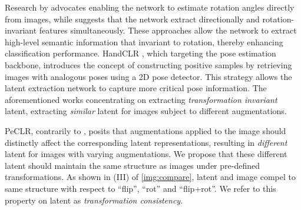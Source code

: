 Research by \cite{singh_explainable_2024} advocates enabling the network to estimate rotation angles directly from images, while \cite{feng_self-supervised_2019} suggests that the network extract directionally and rotation-invariant features simultaneously. These approaches allow the network to extract high-level semantic information that invariant to rotation, thereby enhancing classification performance. HandCLR \cite{lin_pre-training_2024}, which targeting the pose estimation backbone, introduces the concept of constructing positive samples by retrieving images with analogous poses using a 2D pose detector. This strategy allows the latent extraction network to capture more critical pose information. The aforementioned works concentrating on extracting \textit{transformation invariant} latent, extracting \textit{similar} latent for images subject to different augmentations.

PeCLR\cite{spurr_peclr_2022}, contrarily to \cite{lin_pre-training_2024, singh_explainable_2024, su_ri-mae_2024, feng_self-supervised_2019}, posits that augmentations applied to the image should distinctly affect the corresponding latent representations, resulting in \textit{different} latent for images with varying augmentations. We propose that these different latent should maintain the same structure as images under pre-defined transformations. As shown in (III) of \cref{img:compare}, latent and image compel to same structure with respect to ``flip'', ``rot'' and ``flip+rot''. We refer to this property on latent as \textit{transformation consistency}.


